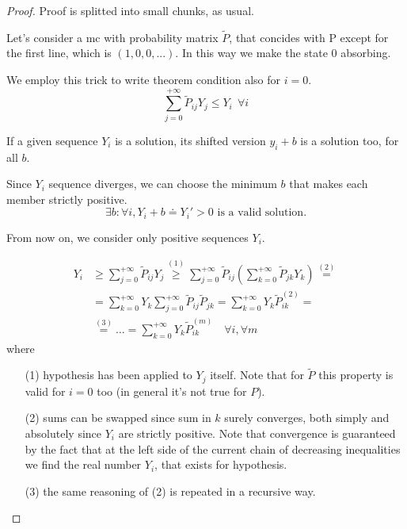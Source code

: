 \begin{proof}
	Proof is splitted into small chunks, as usual.

	\proofpart
		Let's consider a \gls{mc} with probability matrix $\tilde{P}$, that concides with P except for the first line, which is $(1, 0, 0, ...)$.
		In this way we make the state 0 absorbing.

		We employ this trick to write theorem condition also for $i=0$.
		$$ \sum_{j=0}^{+\infty} \tilde{P}_{ij} Y_j \le Y_i ~~ \forall i$$

	\proofpart
		If a given sequence $Y_i$ is a solution, its shifted version $y_i + b$ is a solution too, for all $b$.

		Since $Y_i$ sequence diverges, we can choose the minimum $b$ that makes each member strictly positive.
		\begin{equation}
			\exists b: \forall i, Y_i + b \doteq Y_i' > 0 \text{ is a valid solution.}
		\end{equation}

		From now on, we consider only positive sequences $Y_i$.

	\proofpart
		\begin{equation}\begin{split}
			Y_i & \ge \sum_{j=0}^{+\infty} \tilde{P}_{ij} Y_j \stackrel{(1)}{\ge}
			\sum_{j=0}^{+\infty} \tilde{P}_{ij} \left( \sum_{k=0}^{+\infty} \tilde{P}_{jk} Y_k \right) \stackrel{(2)}{=} \\
			& = \sum_{k=0}^{+\infty} Y_k \sum_{j=0}^{+\infty} \tilde{P}_{ij}  \tilde{P}_{jk} =
			\sum_{k=0}^{+\infty} Y_k \tilde{P}_{ik}^{(2)} = \\
			& \stackrel{(3)}{=} \ldots = \sum_{k=0}^{+\infty} Y_k \tilde{P}_{ik}^{(m)} \quad\forall i,\forall m
		\end{split}\end{equation}
		where
		\begin{itemize}
			\item[(1)] hypothesis has been applied to $Y_j$ itself. Note that for $\tilde{P}$ this property is valid for $i=0$ too (in general it's not true for $P$).
			\item[(2)] sums can be swapped since sum in $k$ surely converges, both simply and absolutely since $Y_i$ are strictly positive. Note that convergence is guaranteed by the fact that at the left side of the current chain of decreasing inequalities we find the real number $Y_i$, that exists for hypothesis.
			\item[(3)] the same reasoning of (2) is repeated in a recursive way.
		\end{itemize}


\end{proof}

